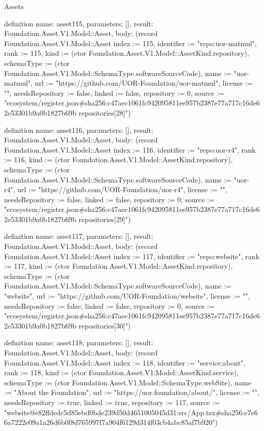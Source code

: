 \begin{lexlean}{Assets}
\begin{semanticmodule}
definition{
  name: asset115,
  parameters: [],
  result: Foundation.Asset.V1.Model::Asset,
  body: (record Foundation.Asset.V1.Model::Asset {index := 115, identifier := "repo:uor-matmul", rank := 115, kind := (ctor Foundation.Asset.V1.Model::AssetKind.repository), schemaType := (ctor Foundation.Asset.V1.Model::SchemaType.softwareSourceCode), name := "uor-matmul", url := "https://github.com/UOR-Foundation/uor-matmul", license := "", needsRepository := false, linked := false, repository := 0, source := "ecosystem/register.json#sha256:c47aec1061fc942095811ee957b2387e77a717c16de62e53301b9a0b1827b69b repositories[28]"})
}

definition{
  name: asset116,
  parameters: [],
  result: Foundation.Asset.V1.Model::Asset,
  body: (record Foundation.Asset.V1.Model::Asset {index := 116, identifier := "repo:uor-r4", rank := 116, kind := (ctor Foundation.Asset.V1.Model::AssetKind.repository), schemaType := (ctor Foundation.Asset.V1.Model::SchemaType.softwareSourceCode), name := "uor-r4", url := "https://github.com/UOR-Foundation/uor-r4", license := "", needsRepository := false, linked := false, repository := 0, source := "ecosystem/register.json#sha256:c47aec1061fc942095811ee957b2387e77a717c16de62e53301b9a0b1827b69b repositories[29]"})
}

definition{
  name: asset117,
  parameters: [],
  result: Foundation.Asset.V1.Model::Asset,
  body: (record Foundation.Asset.V1.Model::Asset {index := 117, identifier := "repo:website", rank := 117, kind := (ctor Foundation.Asset.V1.Model::AssetKind.repository), schemaType := (ctor Foundation.Asset.V1.Model::SchemaType.softwareSourceCode), name := "website", url := "https://github.com/UOR-Foundation/website", license := "", needsRepository := false, linked := false, repository := 0, source := "ecosystem/register.json#sha256:c47aec1061fc942095811ee957b2387e77a717c16de62e53301b9a0b1827b69b repositories[30]"})
}

definition{
  name: asset118,
  parameters: [],
  result: Foundation.Asset.V1.Model::Asset,
  body: (record Foundation.Asset.V1.Model::Asset {index := 118, identifier := "service:about", rank := 118, kind := (ctor Foundation.Asset.V1.Model::AssetKind.service), schemaType := (ctor Foundation.Asset.V1.Model::SchemaType.webSite), name := "About the Foundation", url := "https://uor.foundation/about/", license := "", needsRepository := true, linked := true, repository := 117, source := "website@e82ffdedc5d85ebd0bde239d50d4651005045d31:src/App.tsx#sha256:e7e66a7222e09a1a26d6b0f8d765997f7a904f6129d314f03cb4abc85af7b920"})
}


\end{semanticmodule}
\end{lexlean}
